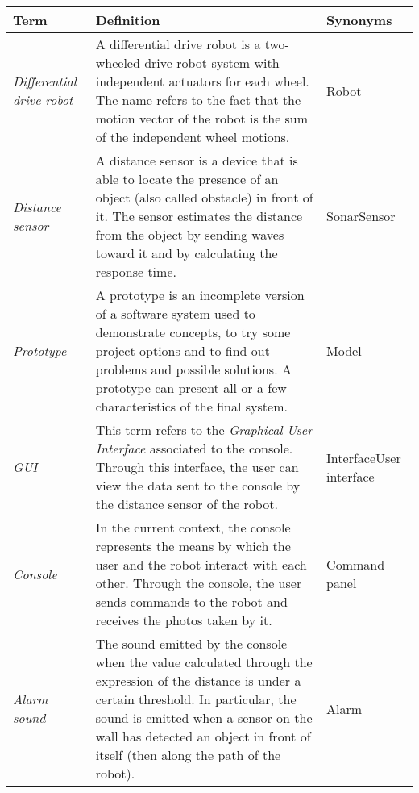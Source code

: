 \documentclass[a4paper]{article}
\begin{document}
\def\arraystretch{1.8}
\begin{tabular}{ | m{3cm} | m{9cm} | m{3cm} | }

    \hline
    
	\textbf{Term} & \textbf{Definition} & \textbf{Synonyms}\\ 
	
	\hline
	
	\textit{Differential drive robot} & A differential drive robot is a two-wheeled drive robot system with independent actuators for each wheel. The name refers to the fact that the motion vector of the robot is the sum of the independent wheel motions. & Robot\\
	
	\hline
	
	\textit{Distance sensor} & A distance sensor is a device that is able to locate the presence of an object (also called obstacle) in front of it. The sensor estimates the distance from the object by sending waves toward it and by calculating the response time. & Sonar\newline Sensor\\
	
	\hline
	
	\textit{Prototype} & A prototype is an incomplete version of a software system used to demonstrate concepts, to try some project options and to find out problems and possible solutions. A prototype can present all or a few characteristics of the final system. & Model\\
	
	\hline
	
	\textit{GUI} & This term refers to the \textit{Graphical User Interface} associated to the console. Through this interface, the user can view the data sent to the console by the distance sensor of the robot. & Interface\newline User interface\\
	
	\hline
	
	\textit{Console} & In the current context, the console represents the means by which the user and the robot interact with each other. Through the console, the user sends commands to the robot and receives the photos taken by it. & Command panel\\
	
	\hline
	
	\textit{Alarm sound} & The sound emitted by the console when the value calculated through the expression of the distance is under a certain threshold. In particular, the sound is emitted when a sensor on the wall has detected an object in front of itself (then along the path of the robot). & Alarm\\
	

\end{tabular}
\end{document}
